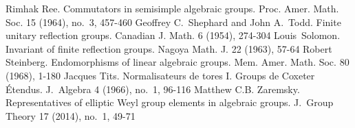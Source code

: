 \documentclass[a4paper,12pt]{amsart}
\theoremstyle{plain}
\theoremstyle{definition}
\begin{document}
\begin{thebibliography}{}
%
Rimhak Ree. Commutators in semisimple algebraic groups. Proc. Amer. Math. Soc. 15 (1964), no.~3, 457-460
%
Geoffrey C.~Shephard and John A.~Todd. Finite unitary reflection groups. Canadian J. Math. 6 (1954), 274-304
%
Louis~Solomon. Invariant of finite reflection groups. Nagoya Math. J. 22 (1963), 57-64
%
Robert Steinberg. Endomorphisms of linear algebraic groups. Mem. Amer. Math. Soc. 80 (1968), 1-180
%
Jacques Tits.  Normalisateurs de tores I. Groups de Coxeter \'Etendus. J.~Algebra 4 (1966), no.~1, 96-116
%
Matthew C.B. Zaremsky. Representatives of elliptic Weyl group elements in algebraic groups. J.~Group Theory 17 (2014), no.~1, 49-71
%
\end{thebibliography}
\end{document}
